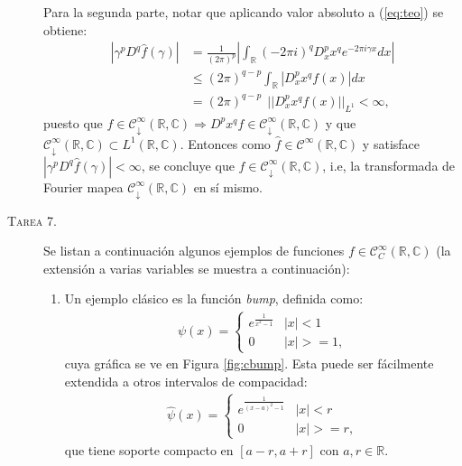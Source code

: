 \documentclass[spanish, fleqn]{article}
\begin{document}
\begin{description}
    Para la segunda parte, notar que aplicando valor absoluto a (\ref{eq:teo}) se obtiene:
    \begin{align*}
        \left|\gamma^p D^q \widehat{f}(\gamma)\right| &= \frac{1}{(2 \pi)^p} \left| \int_{\mathbb{R}} (-2 \pi i)^q D_{x}^{p} x^q e^{-2 \pi i \gamma x} dx \right| \\
        &\leq (2 \pi)^{q-p} \int_{\mathbb{R}} \left| D_{x}^{p} x^q f(x) \right| dx \\
        &= (2 \pi)^{q-p} \ \ ||D_{x}^p x^q f(x)||_{L^1} < \infty,
    \end{align*}
    puesto que $f \in \mathcal{C}_{\downarrow}^\infty(\mathbb{R},\mathbb{C}) \Rightarrow  D^p x^q f \in \mathcal{C}_{\downarrow}^\infty(\mathbb{R},\mathbb{C})$ y que $\mathcal{C}_{\downarrow}^\infty(\mathbb{R},\mathbb{C}) \subset L^1(\mathbb{R},\mathbb{C})$. Entonces como $\widehat{f} \in \mathcal{C}^\infty(\mathbb{R},\mathbb{C})$ y satisface $\left|\gamma^p D^q \widehat{f}(\gamma)\right| < \infty$, se concluye que $\widehat{f} \in \mathcal{C}_{\downarrow}^\infty(\mathbb{R},\mathbb{C})$, i.e, la transformada de Fourier mapea $\mathcal{C}_{\downarrow}^\infty(\mathbb{R},\mathbb{C})$ en sí mismo.




 
    \item[\textsc{Tarea 7.}] Se listan a continuación algunos ejemplos de funciones $f \in \mathcal{C}_{C}^{\infty}(\mathbb{R},\mathbb{C})$ (la extensión a varias variables se muestra a continuación):
    \begin{enumerate}
        \item Un ejemplo clásico es la función \textit{bump}, definida como:
        \begin{align*}
        \psi(x) =
        \begin{cases}
        e^{\frac{1}{x^2-1}} & |x|<1 \\
        0 & |x|>= 1,
        \end{cases}    
        \end{align*}
        cuya gráfica se ve en Figura \ref{fig:cbump}. Esta puede ser fácilmente extendida a otros intervalos de compacidad:
        \begin{align*}
        \widehat{\psi}(x) =
        \begin{cases}
        e^{\frac{1}{(x-a)^2-1}} & |x|<r \\
        0 & |x|>= r,
        \end{cases}    
        \end{align*}
        que tiene soporte compacto en $[a-r, a+r]$ con $a,r \in \mathbb{R}$.


\end{enumerate}
\end{description}
\end{document}
